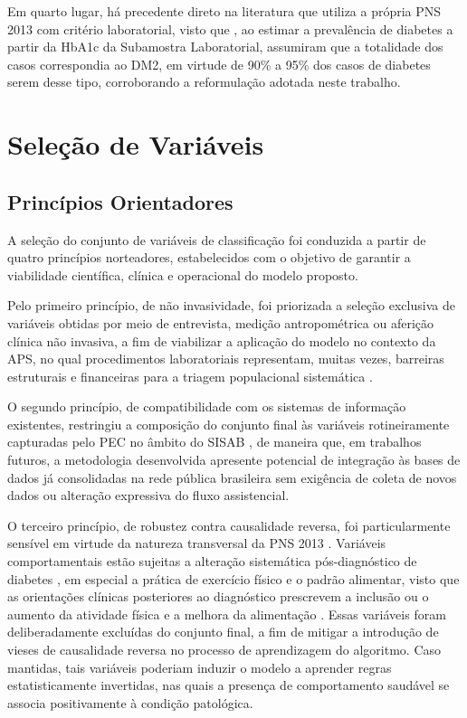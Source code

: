 Em quarto lugar, há precedente direto na literatura que utiliza a própria PNS 2013 com critério laboratorial, visto que \textcite{muzy2021prevalencia}, ao estimar a prevalência de diabetes a partir da HbA1c da Subamostra Laboratorial, assumiram que a totalidade dos casos correspondia ao DM2, em virtude de 90\% a 95\% dos casos de diabetes serem desse tipo, corroborando a reformulação adotada neste trabalho.

\section{Seleção de Variáveis}\label{sec:selecao-variaveis}

\subsection{Princípios Orientadores}\label{sec:principios}
A seleção do conjunto de variáveis de classificação foi conduzida a partir de quatro princípios norteadores, estabelecidos com o objetivo de garantir a viabilidade científica, clínica e operacional do modelo proposto.

Pelo primeiro princípio, de não invasividade, foi priorizada a seleção exclusiva de variáveis obtidas por meio de entrevista, medição antropométrica ou aferição clínica não invasiva, a fim de viabilizar a aplicação do modelo no contexto da APS, no qual procedimentos laboratoriais representam, muitas vezes, barreiras estruturais e financeiras para a triagem populacional sistemática \cite{geremia2020atenccao}.

O segundo princípio, de compatibilidade com os sistemas de informação existentes, restringiu a composição do conjunto final às variáveis rotineiramente capturadas pelo PEC no âmbito do SISAB \cite{brasil_esus_aps}, de maneira que, em trabalhos futuros, a metodologia desenvolvida apresente potencial de integração às bases de dados já consolidadas na rede pública brasileira sem exigência de coleta de novos dados ou alteração expressiva do fluxo assistencial.

O terceiro princípio, de robustez contra causalidade reversa, foi particularmente sensível em virtude da natureza transversal da PNS 2013 \cite{rothman2008modern}. Variáveis comportamentais estão sujeitas a alteração sistemática pós-diagnóstico de diabetes \cite{dimova2020diagnosis}, em especial a prática de exercício físico e o padrão alimentar, visto que as orientações clínicas posteriores ao diagnóstico prescrevem a inclusão ou o aumento da atividade física e a melhora da alimentação \cite{brasil2013}. Essas variáveis foram deliberadamente excluídas do conjunto final, a fim de mitigar a introdução de vieses de causalidade reversa no processo de aprendizagem do algoritmo. Caso mantidas, tais variáveis poderiam induzir o modelo a aprender regras estatisticamente invertidas, nas quais a presença de comportamento saudável se associa positivamente à condição patológica.

